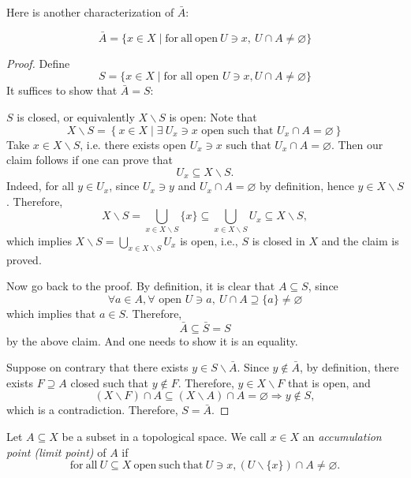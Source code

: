 Here is another characterization of \(\bar{A}\): 
\begin{proposition} \label{prop:closure_of_A}
\[
\bar{A} = \{ x \in  X \mid \mathrm{for\ all\ open\ }U \ni  x,\ U\cap A \neq  \varnothing \}
\]
\end{proposition}

\begin{proof} Define
\[
S = \{ x \in  X \mid  \text{for all open }U \ni  x,U \cap  A \neq  \varnothing \}
\]
It suffices to show that \(\bar{A} = S\): 

 \(S\) is closed, or equivalently $X \smallsetminus  S$ is open: Note that
\[
X \smallsetminus  S = \left\{  {x \in  X\mid \exists\ U_x \ni  x\text{ open such that }U_x \cap  A = \varnothing}\right\}
\]
Take \(x \in  X \smallsetminus  S\), i.e. there exists open \(U_x \ni  x\) such that \(U_x \cap  A = \varnothing\). Then our claim follows if one can prove that
\[U_x \subseteq  X \smallsetminus  S.\]
Indeed, for all \(y \in  U_x\), since \(U_x \ni  y\) and \(U_x \cap  A = \varnothing\) by definition, hence 
\(y \in  X \smallsetminus  S\).
Therefore, 
\[
X \smallsetminus  S = \mathop{\bigcup}\limits_{{x \in  X \smallsetminus  S}}\{ x\}  \subseteq  \mathop{\bigcup}\limits_{{x \in  X \smallsetminus  S}}U_x \subseteq  X \smallsetminus  S,
\]
which implies \(X \smallsetminus  S = \mathop{\bigcup}\limits_{{x \in  X \smallsetminus  S}}U_x\) is open, i.e., \(S\) is closed in \(X\) and the claim is proved.

Now go back to the proof. By definition, it is clear that \(A \subseteq  S\), since
\[
\forall a \in  A,\forall \text{ open }U \ni  a,\ U\cap A \supseteq  \{ a\}  \neq  \varnothing
\]
which implies that $a \in  S$. Therefore, 
\[\bar{A} \subseteq  \bar{S} = S\]
by the above claim. And one needs to show it is an equality.

Suppose on contrary that there exists \(y \in  S \smallsetminus  \bar{A}\). Since \(y \notin  \bar{A}\), by definition, there exists \(F \supseteq  A\) closed such that \(y \notin  F\).
Therefore, \(y \in  X \smallsetminus  F\) that is open, and
\[
\left({X \smallsetminus  F}\right) \cap A \subseteq  \left({X \smallsetminus  A}\right) \cap A = \varnothing  \Rightarrow  y \notin  S,
\]
which is a contradiction. Therefore, \(S = \bar{A}\).
\end{proof}

\begin{definition} Let \(A \subseteq  X\) be a subset in a topological space. We call \(x \in  X\) an \emph{accumulation point (limit point)} of \(A\) if
\[
\mathrm{for\ all\ } U \subseteq  X \mathrm{\ open\ such\ that\ }U \ni  x,\left({U\smallsetminus \{ x\}}\right) \cap A \neq  \varnothing.
\]
\end{definition}

